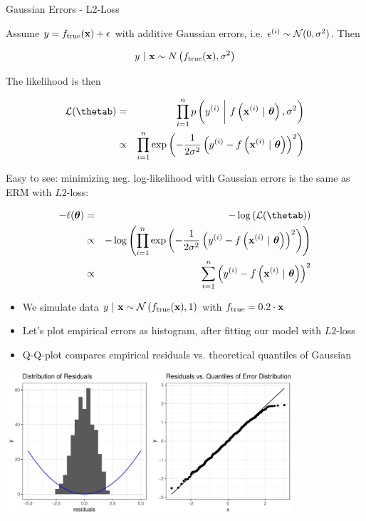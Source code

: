 \documentclass[11pt,compress,t,notes=noshow, xcolor=table]{beamer}
\begin{document}
\begin{vbframe}{Gaussian Errors - L2-Loss} 

Assume $y = f_{\text{true}}(\mathbf{x}) + \epsilon$ with additive Gaussian errors, i.e. $\epsilon^{(i)} \sim \mathcal{N}(0, \sigma^2)$. Then

$$y~|~\mathbf{x} \sim N\left(f_{\text{true}}(\mathbf{x}), \sigma^2\right)$$


The likelihood is then 

\begin{eqnarray*}
\LL(\thetab) &=& \prodin \pdf\left(\yi ~\bigg|~ \fxit, \sigma^2\right) \\ &\propto& \prodin \exp\left(-\frac{1}{2\sigma^2} \left(\yi - \fxit\right)^2\right)
\end{eqnarray*}

\framebreak 

Easy to see: minimizing neg. log-likelihood with Gaussian errors is the same as ERM with $L2$-loss:

\begin{eqnarray*}
- \loglt &=& - \log\left(\LL(\thetab)\right) \\
&\propto& - \log\left(\prodin \exp\left(-\frac{1}{2\sigma^2} \left(\yi - \fxit\right)^2\right)\right) \\
&\propto& \sumin \left(\yi - \fxit\right)^2
\end{eqnarray*}



\framebreak 

\begin{footnotesize}
\begin{itemize}
	\item We simulate data $y ~|~\mathbf{x} \sim \mathcal{N}\left(f_{\text{true}}(\mathbf{x}), 1\right)$ with $f_{\text{true}} = 0.2 \cdot \mathbf{x}$ 
\item Let's plot empirical errors as histogram, after fitting our model with $L2$-loss
\item Q-Q-plot compares empirical residuals vs. theoretical quantiles of Gaussian 
\end{itemize}
\end{footnotesize}

\includegraphics[width = 0.8\textwidth]{figure/residuals_plot_L2.pdf}

\end{vbframe}
\end{document}
